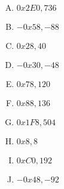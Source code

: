 {{        %
        \begin{practicec}
            \begin{enumerate}[A.]
                \item $0x2E0, 736$
                \item $-0x58, -88$
                \item $0x28, 40$
                \item $-0x30, -48$
                \item $0x78, 120$
                \item $0x88, 136$
                \item $0x1F8, 504$
                \item $0x8, 8$
                \item $0xC0, 192$
                \item $-0x48, -92$
            \end{enumerate}
        \end{practicec}
    }
}
